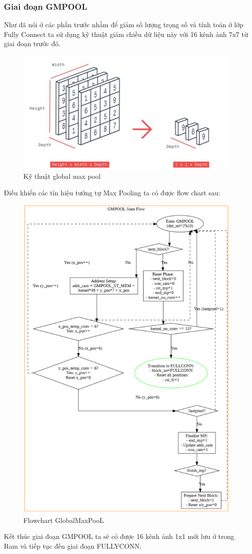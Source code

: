\subsubsection{Giai đoạn GMPOOL}
Như đã nói ở các phần trước nhằm để giảm số lượng trọng số và tính toán ở lớp Fully Connect ta sử dụng kỹ thuật giảm chiều dữ liệu này với 16 kênh ảnh 7x7 từ giai đoạn trước đó.
\begin{figure}[H]
    \centering
    \includegraphics[width=0.75\linewidth]{Images/gmpool2.png}
    \caption{Kỹ thuật global max pool}
    \label{fig:enter-label}
\end{figure}
Điều khiển các tín hiệu tướng tự Max Pooling ta có được flow chart sau:
\begin{figure}[H]
    \centering
    \includegraphics[width=0.75\linewidth]{Images/gmpoolflow.png}
    \caption{Flowchart GlobalMaxPooL}
    \label{fig:enter-label}
\end{figure}
Kết thúc giai đoạn GMPOOL ta sẽ có được 16 kênh ảnh 1x1 mới lưu ở trong Ram và tiếp tục đến giai đoạn FULLYCONN.

